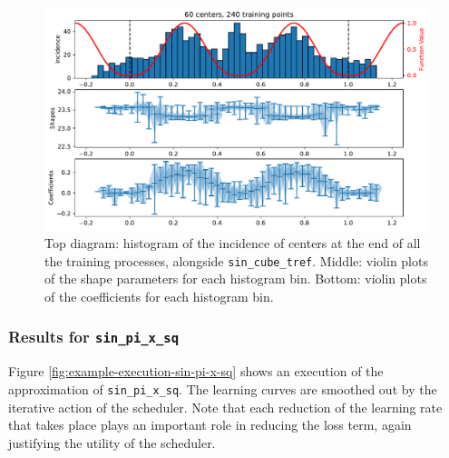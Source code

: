 \documentclass[12pt]{report} %
\begin{document}
\begin{figure}
  \includegraphics[width=\textwidth]{imagenes/experiments/1d/statistical_1d_full_scheduler_interpolation/sin_cube_tref/C60-TR240-sin_cube_tref.pdf}
  \caption{Top diagram: histogram of the incidence of centers at the end of all the training processes, alongside \texttt{sin\_cube\_tref}. Middle: violin plots of the shape parameters for each histogram bin. Bottom: violin plots of the coefficients for each histogram bin.}
  \label{fig:triple-plot-sin-cube-tref-function}
\end{figure}

\clearpage
\subsubsection*{Results for \texttt{sin\_pi\_x\_sq}}

Figure \ref{fig:example-execution-sin-pi-x-sq} shows an execution of the approximation of \texttt{sin\_pi\_x\_sq}. The learning curves are smoothed out by the iterative action of the scheduler. Note that each reduction of the learning rate that takes place plays an important role in reducing the loss term, again justifying the utility of the scheduler.
\end{document}
